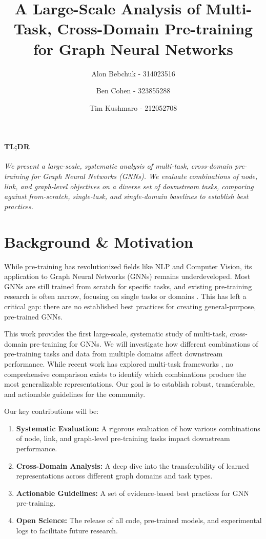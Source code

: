 \documentclass{acmart}
\title{A Large-Scale Analysis of Multi-Task, Cross-Domain Pre-training for Graph Neural Networks}
\author{Alon Bebchuk - 314023516}
\author{Ben Cohen - 323855288}
\author{Tim Kushmaro - 212052708}
\date{}
\begin{document}
\maketitle

\paragraph{TL;DR} \textit{We present a large-scale, systematic analysis of multi-task, cross-domain pre-training for Graph Neural Networks (GNNs). We evaluate combinations of node, link, and graph-level objectives on a diverse set of downstream tasks, comparing against from-scratch, single-task, and single-domain baselines to establish best practices.}

\section{Background \& Motivation}

While pre-training has revolutionized fields like NLP and Computer Vision, its application to Graph Neural Networks (GNNs) remains underdeveloped. Most GNNs are still trained from scratch for specific tasks, and existing pre-training research is often narrow, focusing on single tasks or domains \cite{hu2020strategies, you2020graph, hu2020gptgnn}. This has left a critical gap: there are no established best practices for creating general-purpose, pre-trained GNNs.

This work provides the first large-scale, systematic study of multi-task, cross-domain pre-training for GNNs. We will investigate how different combinations of pre-training tasks and data from multiple domains affect downstream performance. While recent work has explored multi-task frameworks \cite{wu2022multi, wang2022graphmvp}, no comprehensive comparison exists to identify which combinations produce the most generalizable representations. Our goal is to establish robust, transferable, and actionable guidelines for the community.

Our key contributions will be:
\begin{enumerate}
    \item \textbf{Systematic Evaluation:} A rigorous evaluation of how various combinations of node, link, and graph-level pre-training tasks impact downstream performance.
    \item \textbf{Cross-Domain Analysis:} A deep dive into the transferability of learned representations across different graph domains and task types.
    \item \textbf{Actionable Guidelines:} A set of evidence-based best practices for GNN pre-training.
    \item \textbf{Open Science:} The release of all code, pre-trained models, and experimental logs to facilitate future research.
\end{enumerate}
\end{document}
